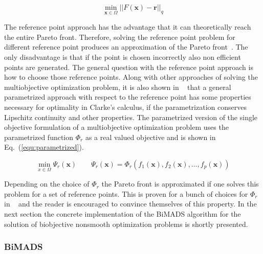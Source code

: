 \documentclass[a4paper,10pt]{article}
\renewcommand{\vec}[1]{\mathbf{#1}}
\newcommand{\equref}[1]{Eq.~(\ref{#1})}
\begin{document}
    \begin{equation}
        \min_{\vec{x} \in \Omega} || F(\vec{x}) - \vec{r} ||_q
    \end{equation}

    The reference point approach has the advantage that it can theoretically
    reach the entire Pareto front.
    Therefore, solving the reference point problem for different reference point
    produces an approximation of the Pareto front~\cite{multiobjective}.
    The only disadvantage is that if the point is chosen incorrectly
    also non efficient points are generated.
    The general question with the reference point approach is how to
    choose those reference points.
    Along with other approaches of solving the multiobjective optimization
    problem, it is also shown in ~\cite{multiobjective} that a general
    parametrized approach with respect to the reference point has some
    properties necessary for optimality in Clarke's calculus, if the
    parametrization conserves Lipschitz continuity and other properties.
    The parametrized version of the single objective formulation of 
    a multiobjective optimization problem uses the parametrized function
    $\Phi_r$ as a real valued objective and is shown in
    \equref{equ:parametrized}.
    
    \begin{equation}
        \label{equ:parametrized}
        \min_{x \in \Omega} \Psi_r(\vec{x}) \quad \quad \Psi_r(\vec{x}) =
         \Phi_r(f_1(\vec{x}),f_2(\vec{x}),\dots,f_p(\vec{x})) 
    \end{equation}

    Depending on the choice of $\Phi_r$ the Pareto front is approximated
    if one solves this problem for a set of reference points.
    This is proven for a bunch of choices for $\Phi_r$ in ~\cite{multiobjective}
    and the reader is encouraged to convince themselves of this property.
    In the next section the concrete implementation of the BiMADS algorithm
    for the solution of biobjective nonsmooth optimization problems 
    is shortly presented.

    \subsubsection{BiMADS}
\end{document}
